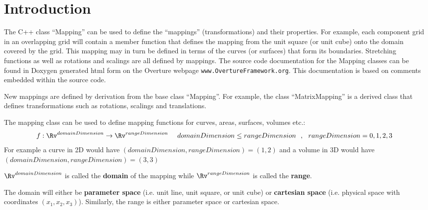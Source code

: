 \documentclass[xcolor=rgb,svgnames,dvipsnames]{article}
\newcommand{\normalss}{\sffamily}
\newcommand{\largess}{\large\sffamily}
\newcommand{\Index}[1]{#1\index{#1}}
\begin{document}
\vspace{3\baselineskip}

% 

\section{Introduction}

The C++ class ``Mapping'' can be used to define the ``mappings''
(transformations) and their properties. For example, each component grid in an
overlapping grid will contain a member function that defines the mapping from
the unit square (or unit cube) onto the domain covered by the grid. This mapping
may in turn be defined in terms of the curves (or surfaces) that form its
boundaries.  Stretching functions as well as rotations and scalings are all
defined by mappings. The source code documentation for the Mapping classes
can be found in Doxygen generated html form on the Overture webpage {\tt www.OvertureFramework.org}. 
This documentation is based on comments embedded within the source code. 

New mappings are defined by derivation from the base class ``Mapping''.
For example, the class ``MatrixMapping'' is a derived class that
defines transformations such as rotations, scalings and translations.

\def\domaind {{domainDimension}}
\def\ranged {{rangeDimension}}
The mapping class can be used to define mapping functions for curves, areas, 
surfaces, volumes etc.:
$$
     f : \Rv^\domaind \rightarrow \Rv^\ranged ~~~~\domaind\le \ranged ~~,~~ 
     \ranged=0,1,2,3
$$
For example a curve in 2D would have $(\domaind,\ranged)=(1,2)$ and a volume
in 3D would have $(\domaind,\ranged)=(3,3)$

\vspace{\baselineskip\noindent}
$\Rv^\domaind$ is called the {\bf domain} of the mapping while
$\Rv^\ranged$ is called the {\bf range}.

The domain will either be {\bf \Index{parameter space}} (i.e. unit line, unit square,
or unit cube) or {\bf \Index{cartesian space}} (i.e. physical space with
coordinates $(x_1,x_2,x_3)$). Similarly, the range is either parameter
space or cartesian space.


\newcommand{\classMapping}{%
\parbox{4cm}{\normalss%
\begin{center}\largess
Class Mapping
\end{center} 
\begin{flushleft}
{\tt map(r,x,xr)}\\
{\tt inverseMap(x,r,rx)}\\
{\tt update( ... ))}\\
{\tt getBoundaryCondition(...)}\\
{\tt setBoundaryCondition(...)}\\
{\tt etc.}
\end{flushleft}
}}
\end{document}
